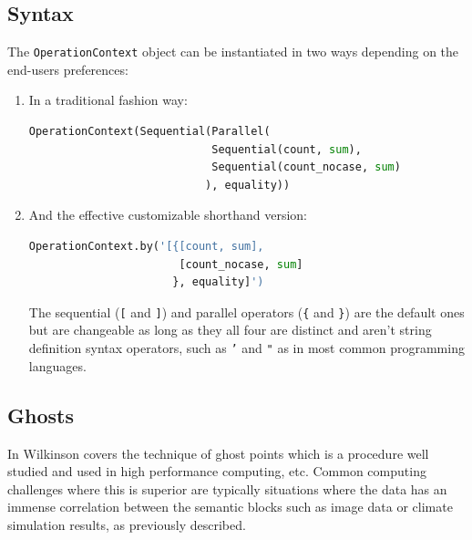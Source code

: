 \subsection{Syntax}
The \texttt{OperationContext} object can be instantiated in two ways depending on the end-users preferences:
\vspace*{2mm}

\begin{enumerate}
	\item In a traditional fashion way:
\vspace*{2mm}
\begin{lstlisting}[language=Python, basicstyle=\footnotesize, numbers=none, showtabs=false, showstringspaces=false, showspaces=false, 
otherkeywords={[,{,},],Sequential,Parallel,OperationContext}, deletendkeywords={sum}]
OperationContext(Sequential(Parallel(
                            Sequential(count, sum), 
                            Sequential(count_nocase, sum)
                           ), equality))
\end{lstlisting}
\vspace*{-2mm}
	\item And the effective customizable shorthand version:
\vspace*{2mm}
\begin{lstlisting}[language=Python, basicstyle=\footnotesize, numbers=none, showtabs=false, showstringspaces=false, showspaces=false, 
otherkeywords={[,{,},],Sequential,Parallel,OperationContext}, deletendkeywords={sum}]
OperationContext.by('[{[count, sum], 
                       [count_nocase, sum]
                      }, equality]')
\end{lstlisting}
\vspace*{-2mm}
	The sequential (\texttt{[} and \texttt{]}) and parallel operators (\texttt{\{} and \texttt{\}}) are the default ones but are changeable as long as they all four are distinct and aren't string definition syntax operators, such as \texttt{'} and \texttt{"} as in most common programming languages.
\end{enumerate}

\subsection{Ghosts}
In \cite{Wilkinson:1998:PPT:289352} Wilkinson \etal covers the technique of ghost points which is a procedure well studied and used in high performance computing, etc. Common computing challenges where this is superior are typically situations where the data has an immense correlation between the semantic blocks such as image data or climate simulation results, as previously described. 
\newline

